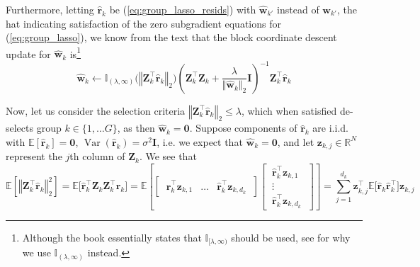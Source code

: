 \documentclass{article}
\numberwithin{equation}{section}
\begin{document}
Furthermore, letting $ \hat{\mathbf{r}}_k $ be (\ref{eq:group_lasso_resids})
with $ \hat{\mathbf{w}}_{k'} $ instead of $ \mathbf{w}_{k'} $, the hat
indicating satisfaction of the zero subgradient equations for
(\ref{eq:group_lasso}), we know from the text that the block coordinate
descent update for $ \hat{\mathbf{w}}_k $ is\footnote{
    Although the book essentially states that
    $ \mathbb{I}_{[\lambda, \infty)} $ should be used, see 
    for why we use $ \mathbb{I}_{(\lambda, \infty)} $ instead.
}
\begin{equation} \label{eq:group_lasso_block_update}
    \hat{\mathbf{w}}_k \leftarrow
    \mathbb{I}_{(\lambda, \infty)}
    \big(\left\Vert\mathbf{Z}_k^\top\hat{\mathbf{r}}_k\right\Vert_2\big)
    \left(
        \mathbf{Z}_k^\top\mathbf{Z}_k +
        \frac{\lambda}{\Vert\hat{\mathbf{w}}_k\Vert_2}\mathbf{I}
    \right)^{-1}
    \mathbf{Z}_k^\top\hat{\mathbf{r}}_k
\end{equation}

Now, let us consider the selection criteria
$ \left\Vert\mathbf{Z}_k^\top\hat{\mathbf{r}}_k\right\Vert_2 \le \lambda $,
which when satisfied de-selects group $ k \in \{1, \ldots G\} $, as then
$ \hat{\mathbf{w}}_k = \mathbf{0} $. Suppose components of
$ \hat{\mathbf{r}}_k $ are i.i.d. with $ \mathbb{E}[\hat{\mathbf{r}}_k] =
\mathbf{0} $, $ \operatorname{Var}(\hat{\mathbf{r}}_k) = \sigma^2\mathbf{I} $,
i.e. we expect that $ \hat{\mathbf{w}}_k = \mathbf{0} $, and let
$ \mathbf{z}_{k, j} \in \mathbb{R}^N $ represent the $ j $th column of
$ \mathbf{Z}_k $. We see that
\begin{equation} \label{eq:4.5.1}
    \mathbb{E}\left[
        \left\Vert\mathbf{Z}_k^\top\hat{\mathbf{r}}_k\right\Vert_2^2
    \right] =
    \mathbb{E}\big[
        \hat{\mathbf{r}}_k^\top\mathbf{Z}_k\mathbf{Z}_k^\top
        \hat{\mathbf{r}}_k
    \big] =
    \mathbb{E}\left[
        \begin{bmatrix}
            \ \hat{\mathbf{r}}_k^\top\mathbf{z}_{k, 1} &
            \ldots &
            \hat{\mathbf{r}}_k^\top\mathbf{z}_{k, d_k} \
        \end{bmatrix}
        \begin{bmatrix}
            \ \hat{\mathbf{r}}_k^\top\mathbf{z}_{k, 1} \ \\
            \ \vdots \ \\
            \ \hat{\mathbf{r}}_k^\top\mathbf{z}_{k, d_k} \
        \end{bmatrix}
    \right] =
    \sum_{j = 1}^{d_k}
    \mathbf{z}_{k, j}^\top
    \mathbb{E}\big[\hat{\mathbf{r}}_k\hat{\mathbf{r}}_k^\top\big]
    \mathbf{z}_{k, j}
\end{equation}
\end{document}
